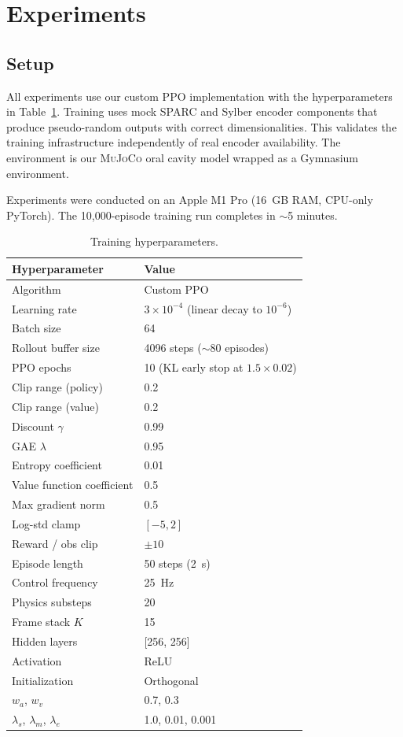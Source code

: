 \documentclass[11pt, a4paper]{article}
\newcommand{\mujoco}{\textsc{MuJoCo}}
\begin{document}
\section{Experiments}
\label{sec:experiments}

\subsection{Setup}

All experiments use our custom PPO implementation with the hyperparameters in Table~\ref{tab:hyperparams}. Training uses mock SPARC and Sylber encoder components that produce pseudo-random outputs with correct dimensionalities. This validates the training infrastructure independently of real encoder availability. The environment is our \mujoco{} oral cavity model wrapped as a Gymnasium~\cite{brockman2016openai} environment.

Experiments were conducted on an Apple M1 Pro (16~GB RAM, CPU-only PyTorch). The 10,000-episode training run completes in $\sim$5 minutes.

\begin{table}[t]
\centering
\caption{Training hyperparameters.}
\label{tab:hyperparams}
\small
\begin{tabular}{ll}
\toprule
Hyperparameter & Value \\
\midrule
Algorithm & Custom PPO \\
Learning rate & $3 \times 10^{-4}$ (linear decay to $10^{-6}$) \\
Batch size & 64 \\
Rollout buffer size & 4096 steps ($\sim$80 episodes) \\
PPO epochs & 10 (KL early stop at $1.5 \times 0.02$) \\
Clip range (policy) & 0.2 \\
Clip range (value) & 0.2 \\
Discount $\gamma$ & 0.99 \\
GAE $\lambda$ & 0.95 \\
Entropy coefficient & 0.01 \\
Value function coefficient & 0.5 \\
Max gradient norm & 0.5 \\
Log-std clamp & $[-5, 2]$ \\
Reward / obs clip & $\pm 10$ \\
Episode length & 50 steps (2~s) \\
Control frequency & 25~Hz \\
Physics substeps & 20 \\
Frame stack $K$ & 15 \\
Hidden layers & [256, 256] \\
Activation & ReLU \\
Initialization & Orthogonal \\
$w_a$, $w_v$ & 0.7, 0.3 \\
$\lambda_s$, $\lambda_m$, $\lambda_e$ & 1.0, 0.01, 0.001 \\
\bottomrule
\end{tabular}
\end{table}
\end{document}
